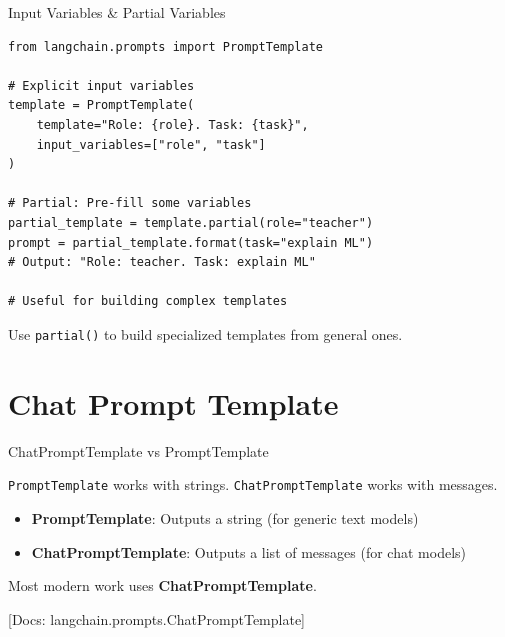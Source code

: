 \documentclass[aspectratio=169,11pt]{beamer}
\newcommand{\docref}[1]{{\scriptsize\color{docgray}[Docs: #1]}}
\begin{document}
\begin{frame}[fragile]{Input Variables \& Partial Variables}
  \begin{codebox}
    \begin{lstlisting}
from langchain.prompts import PromptTemplate

# Explicit input variables
template = PromptTemplate(
    template="Role: {role}. Task: {task}",
    input_variables=["role", "task"]
)

# Partial: Pre-fill some variables
partial_template = template.partial(role="teacher")
prompt = partial_template.format(task="explain ML")
# Output: "Role: teacher. Task: explain ML"

# Useful for building complex templates
    \end{lstlisting}
  \end{codebox}

  \vspace{0.08cm}
  \begin{tipbox}[Pattern]
    Use \texttt{partial()} to build specialized templates from general ones.
  \end{tipbox}
\end{frame}

\section{Chat Prompt Template}

\begin{frame}{ChatPromptTemplate vs PromptTemplate}
  \begin{conceptbox}
    \texttt{PromptTemplate} works with strings. \texttt{ChatPromptTemplate} works with messages.
  \end{conceptbox}

  \begin{itemize}
    \setlength{\itemsep}{1pt}
    \item \textbf{PromptTemplate}: Outputs a string (for generic text models)
    \item \textbf{ChatPromptTemplate}: Outputs a list of messages (for chat models)
  \end{itemize}

  \vspace{0.08cm}
  Most modern work uses \textbf{ChatPromptTemplate}.

  \docref{langchain.prompts.ChatPromptTemplate}
\end{frame}
\end{document}
